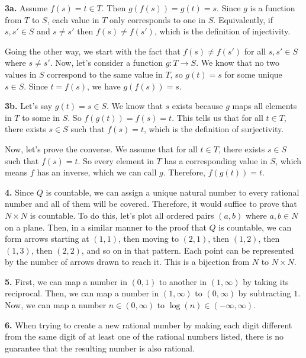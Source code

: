 \documentclass{article}
\begin{document}
\textbf{3a.} Assume $f(s) = t \in T$. Then $g(f(s)) = g(t) = s$. Since $g$ is a function from $T$ to $S$, each value in $T$ only corresponds to one in $S$. Equivalently, if $s, s' \in S$ and $s \neq s'$ then $f(s) \neq f(s')$, which is the definition of injectivity.
\newline

Going the other way, we start with the fact that $f(s) \neq f(s')$ for all $s, s' \in S$ where $s \neq s'$. Now, let's consider a function $g: T \rightarrow S$. We know that no two values in $S$ correspond to the same value in $T$, so $g(t) = s$ for some unique $s \in S$. Since $t = f(s)$, we have $g(f(s)) = s$.
\newline

\textbf{3b.} Let's say $g(t) = s \in S$. We know that $s$ exists because $g$ maps all elements in $T$ to some in $S$. So $f(g(t)) = f(s) = t$. This tells us that for all $t \in T$, there exists $s \in S$ such that $f(s) = t$, which is the definition of surjectivity.
\newline

Now, let's prove the converse. We assume that for all $t \in T$, there exists $s \in S$ such that $f(s) = t$. So every element in $T$ has a corresponding value in $S$, which means $f$ has an inverse, which we can call $g$. Therefore, $f(g(t)) = t$.
\newline

\textbf{4.} Since $Q$ is countable, we can assign a unique natural number to every rational number and all of them will be covered. Therefore, it would suffice to prove that $N \times N$ is countable. To do this, let's plot all ordered pairs $(a, b)$ where $a, b \in N$ on a plane. Then, in a similar manner to the proof that $Q$ is countable, we can form arrows starting at $(1, 1)$, then moving to $(2, 1)$, then $(1, 2)$, then $(1, 3)$, then $(2, 2)$, and so on in that pattern. Each point can be represented by the number of arrows drawn to reach it. This is a bijection from $N$ to $N \times N$.
\newline

\textbf{5.} First, we can map a number in $(0, 1)$ to another in $(1, \infty)$ by taking its reciprocal. Then, we can map a number in $(1, \infty)$ to $(0, \infty)$ by subtracting $1$. Now, we can map a number $n \in (0, \infty)$ to $\log(n) \in (-\infty, \infty)$.
\newline

\textbf{6.} When trying to create a new rational number by making each digit different from the same digit of at least one of the rational numbers listed, there is no guarantee that the resulting number is also rational.
\newline
\end{document}
